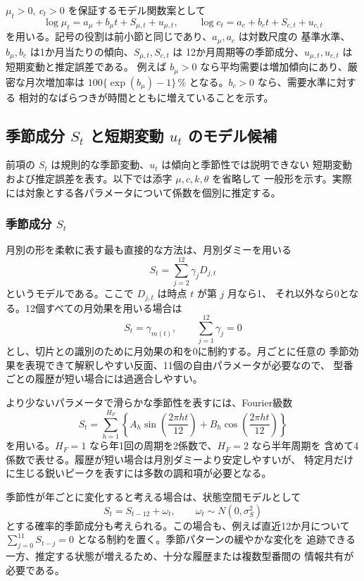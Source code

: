\documentclass[a4paper,11pt]{jsarticle}
\begin{document}
$\mu_t>0,\ c_t>0$ を保証するモデル関数案として
\[
\log\mu_t=a_\mu+b_\mu t+S_{\mu,t}+u_{\mu,t},\qquad
\log c_t=a_c+b_ct+S_{c,t}+u_{c,t}
\]
を用いる。記号の役割は前小節と同じであり、$a_\mu,a_c$ は対数尺度の
基準水準、$b_\mu,b_c$ は1か月当たりの傾向、$S_{\mu,t},S_{c,t}$ は
12か月周期等の季節成分、$u_{\mu,t},u_{c,t}$ は短期変動と推定誤差である。
例えば $b_\mu>0$ なら平均需要は増加傾向にあり、厳密な月次増加率は
$100\{\exp(b_\mu)-1\}$\,\% となる。$b_c>0$ なら、需要水準に対する
相対的なばらつきが時間とともに増えていることを示す。

\subsection{季節成分 $S_t$ と短期変動 $u_t$ のモデル候補}

前項の $S_t$ は規則的な季節変動、$u_t$ は傾向と季節性では説明できない
短期変動および推定誤差を表す。以下では添字 $\mu,c,k,\theta$ を省略して
一般形を示す。実際には対象とする各パラメータについて係数を個別に推定する。

\subsubsection{季節成分 $S_t$}

月別の形を柔軟に表す最も直接的な方法は、月別ダミーを用いる
\[
S_t=\sum_{j=2}^{12}\gamma_jD_{j,t}
\]
というモデルである。ここで $D_{j,t}$ は時点 $t$ が第 $j$ 月なら1、
それ以外なら0となる。12個すべての月効果を用いる場合は
\[
S_t=\gamma_{m(t)},\qquad \sum_{j=1}^{12}\gamma_j=0
\]
とし、切片との識別のために月効果の和を0に制約する。月ごとに任意の
季節効果を表現できて解釈しやすい反面、11個の自由パラメータが必要なので、
型番ごとの履歴が短い場合には過適合しやすい。

より少ないパラメータで滑らかな季節性を表すには、Fourier級数
\[
S_t=\sum_{h=1}^{H_F}\left\{
A_h\sin\left(\frac{2\pi ht}{12}\right)
+B_h\cos\left(\frac{2\pi ht}{12}\right)\right\}
\]
を用いる。$H_F=1$ なら年1回の周期を2係数で、$H_F=2$ なら半年周期を
含めて4係数で表せる。履歴が短い場合は月別ダミーより安定しやすいが、
特定月だけに生じる鋭いピークを表すには多数の調和項が必要となる。

季節性が年ごとに変化すると考える場合は、状態空間モデルとして
\[
S_t=S_{t-12}+\omega_t,\qquad
\omega_t\sim N(0,\sigma_S^2)
\]
とする確率的季節成分も考えられる。この場合も、例えば直近12か月について
$\sum_{j=0}^{11}S_{t-j}=0$ となる制約を置く。季節パターンの緩やかな変化を
追跡できる一方、推定する状態が増えるため、十分な履歴または複数型番間の
情報共有が必要である。
\end{document}
